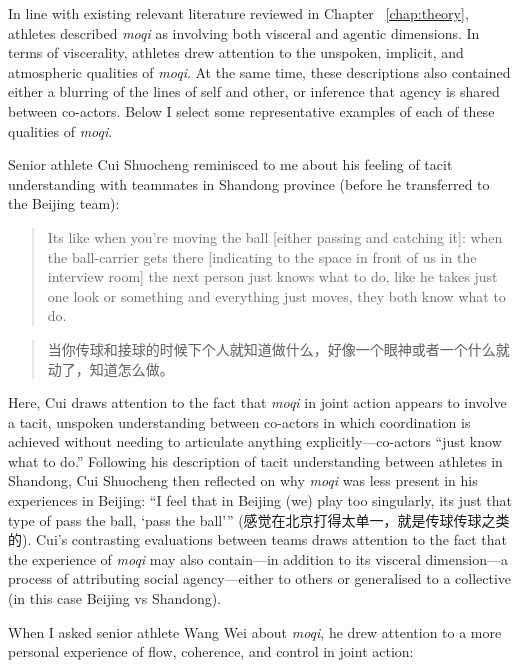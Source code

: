\begin{CJK}{UTF8}{gbsn}
In line with existing relevant literature reviewed in Chapter ~\ref{chap:theory}, athletes described \textit{moqi} as involving both visceral and agentic dimensions.  In terms of viscerality, athletes drew attention to the unspoken, implicit, and atmospheric qualities of \textit{moqi}.  At the same time, these descriptions also contained either a blurring of the lines of self and other, or inference that agency is shared between co-actors.  Below I select some representative examples of each of these qualities of \textit{moqi}.

Senior athlete Cui Shuocheng reminisced to me about his feeling of tacit understanding with teammates in Shandong province (before he transferred to the Beijing team):

\begin{quote}
       Its like when you're moving the ball [either passing and catching it]: when the ball-carrier gets there [indicating to the space in front of us in the interview room] the next person just knows what to do, like he takes just one look or something and everything just moves, they both know what to do.
\end{quote}

\begin{quote}
         当你传球和接球的时候下个人就知道做什么，好像一个眼神或者一个什么就动了，知道怎么做。
\end{quote}

Here, Cui draws attention to the fact that \textit{moqi} in joint action appears to involve a tacit, unspoken understanding between co-actors in which coordination is achieved without needing to articulate anything explicitly---co-actors ``just know what to do.''   Following his description of tacit understanding between athletes in Shandong, Cui Shuocheng then reflected on why \textit{moqi} was less present in his experiences in Beijing: ``I feel that in Beijing (we) play too singularly, its just that type of pass the ball, `pass the ball'''  (感觉在北京打得太单一，就是传球传球之类的).  Cui's contrasting evaluations  between teams draws attention to the fact that the experience of \textit{moqi} may also contain---in addition to its visceral dimension---a process of attributing social agency---either to others or generalised to a collective (in this case Beijing vs Shandong).

When I asked senior athlete Wang Wei about \textit{moqi}, he drew attention to a more personal experience of flow, coherence, and control in joint action:


\end{CJK}
